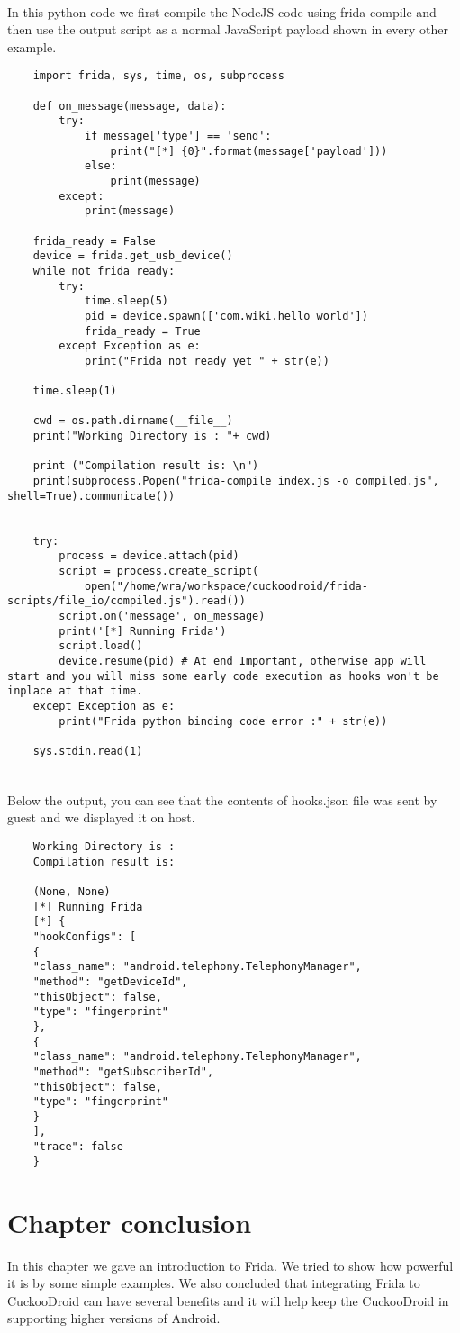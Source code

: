 \documentclass[../main.tex]{subfile}
\begin{document}
	\paragraph{} In this python code we first compile the NodeJS code using frida-compile and then use the output script as a normal JavaScript payload shown in every other example.
	\begin{lstlisting}
	import frida, sys, time, os, subprocess
	
	def on_message(message, data):
		try:
			if message['type'] == 'send':
				print("[*] {0}".format(message['payload']))
			else:
				print(message)
		except:
			print(message)
		
	frida_ready = False
	device = frida.get_usb_device()
	while not frida_ready:
		try:
			time.sleep(5)
			pid = device.spawn(['com.wiki.hello_world'])
			frida_ready = True
		except Exception as e:
			print("Frida not ready yet " + str(e))
	
	time.sleep(1)
	
	cwd = os.path.dirname(__file__)
	print("Working Directory is : "+ cwd)
	
	print ("Compilation result is: \n")
	print(subprocess.Popen("frida-compile index.js -o compiled.js", shell=True).communicate())
	
	
	try:
		process = device.attach(pid)
		script = process.create_script(
			open("/home/wra/workspace/cuckoodroid/frida-scripts/file_io/compiled.js").read())
		script.on('message', on_message)
		print('[*] Running Frida')
		script.load()
		device.resume(pid) # At end Important, otherwise app will start and you will miss some early code execution as hooks won't be inplace at that time.
	except Exception as e:
		print("Frida python binding code error :" + str(e))
	
	sys.stdin.read(1)
	
	\end{lstlisting}

	\paragraph{} Below the output, you can see that the contents of hooks.json file was sent by guest and we displayed it on host.
	\begin{lstlisting}
	Working Directory is : 
	Compilation result is: 
	
	(None, None)
	[*] Running Frida
	[*] {
	"hookConfigs": [
	{
	"class_name": "android.telephony.TelephonyManager", 
	"method": "getDeviceId", 
	"thisObject": false, 
	"type": "fingerprint" 
	}, 
	{
	"class_name": "android.telephony.TelephonyManager", 
	"method": "getSubscriberId", 
	"thisObject": false, 
	"type": "fingerprint" 
	}
	], 
	"trace": false
	}
	\end{lstlisting}
	
	\section{Chapter conclusion} In this chapter we gave an introduction to Frida. We tried to show how powerful it is by some simple examples. We also concluded that integrating Frida to CuckooDroid can have several benefits and it will help keep the CuckooDroid in supporting higher versions of Android. 
\end{document}
